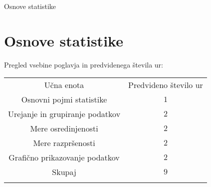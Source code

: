 \begin{priprava}{0}{}{}{Osnove statistike}{}{}

    \chapter{Osnove statistike}

    \Large{Pregled vsebine poglavja in predvidenega števila ur:}

    \begin{table}[H]
        \centering
        \begin{tabular}{||c|c||} 
        \hhline{|t:==:t|}
        \rowcolor[rgb]{0.843,0.718,0.718} 
        Učna enota  & Predvideno število ur   \\ 
        \hhline{|:==:|}
        Osnovni pojmi statistike & $1$    \\ 
        \hline
        Urejanje in grupiranje podatkov & $2$    \\ 
        \hline
        Mere osredinjenosti & $2$    \\ 
        \hline
        Mere razpršenosti & $2$     \\
        \hline
        Grafično prikazovanje podatkov & $2$     \\
        \hhline{|:==:|}
        Skupaj & $9$     \\
        \hhline{|b:==:b|}
        \end{tabular}
    \end{table}


\end{priprava}